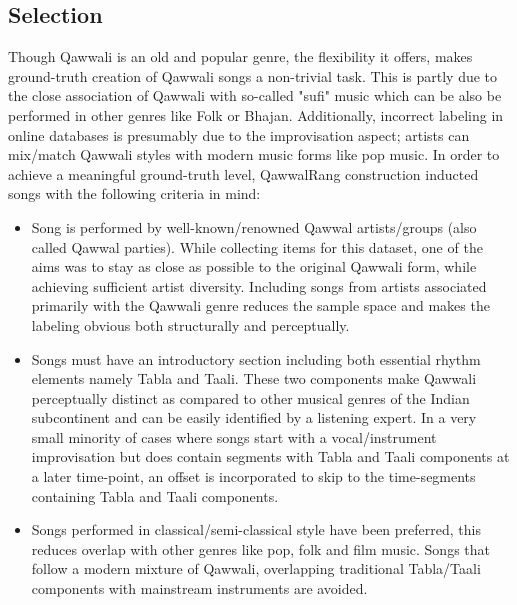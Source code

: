 \documentclass{article}
\begin{document}
\subsection{Selection}
Though Qawwali is an old and popular genre, the flexibility it offers, makes ground-truth creation of Qawwali songs a non-trivial task. This is partly due to the close association of Qawwali with so-called "sufi" music\citep{qureshi1986sufi} which can be also be performed in other genres like Folk or Bhajan. Additionally, incorrect labeling in online databases is presumably due to the improvisation aspect; artists can mix/match Qawwali styles with modern music forms like pop music. In order to achieve a meaningful ground-truth level, QawwalRang construction inducted songs with the following criteria in mind:
\begin{itemize}
\item Song is performed by well-known/renowned Qawwal artists/groups (also called Qawwal parties). While collecting items for this dataset, one of the aims was to stay as close as possible to the original Qawwali form, while achieving sufficient artist diversity. Including songs from artists associated primarily with the Qawwali genre reduces the sample space and makes the labeling obvious both structurally and perceptually.
\item Songs must have an introductory section including both essential rhythm elements namely Tabla and Taali. These two components make Qawwali perceptually distinct as compared to other musical genres of the Indian subcontinent and can be easily identified by a listening expert. In a very small minority of cases where songs start with a vocal/instrument improvisation but does contain segments with Tabla and Taali components at a later time-point, an offset is incorporated to skip to the time-segments containing Tabla and Taali components.
\item Songs performed in classical/semi-classical style have been preferred, this reduces overlap with other genres like pop, folk and film music. Songs that follow a modern mixture of Qawwali, overlapping traditional Tabla/Taali components with mainstream instruments are avoided.
\end{itemize}
\end{document}
